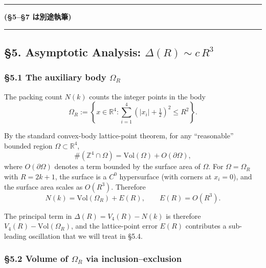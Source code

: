 \documentclass[a4paper,11pt]{article}
\theoremstyle{definition}
\begin{document}
\begin{center}\rule{0.5\linewidth}{0.5pt}\end{center}

\textbf{(§5--§7 は別途執筆)}

\begin{center}\rule{0.5\linewidth}{0.5pt}\end{center}

\subsection{\texorpdfstring{§5. Asymptotic Analysis:
\(\Delta(R) \sim c\,R^3\)}{§5. Asymptotic Analysis: \textbackslash Delta(R) \textbackslash sim c\textbackslash,R\^{}3}}\label{asymptotic-analysis-deltar-sim-cr3}

\subsubsection{\texorpdfstring{§5.1 The auxiliary body
\(\Omega_R\)}{§5.1 The auxiliary body \textbackslash Omega\_R}}\label{the-auxiliary-body-omega_r}

The packing count \(N(k)\) counts the integer points in the body
\[\Omega_R := \left\{x \in \mathbb{R}^4 : \sum_{i=1}^{4} (|x_i| + \tfrac{1}{2})^2 \le R^2\right\}.\]

By the standard convex-body lattice-point theorem, for any
``reasonable'' bounded region \(\Omega \subset \mathbb{R}^4\),
\[\#(\mathbb{Z}^4 \cap \Omega) = \mathrm{Vol}(\Omega) + O(\partial\Omega),\]
where \(O(\partial\Omega)\) denotes a term bounded by the surface area
of \(\Omega\). For \(\Omega = \Omega_R\) with \(R = 2k+1\), the surface
is a \(C^0\) hypersurface (with corners at \(x_i = 0\)), and the surface
area scales as \(O(R^3)\). Therefore
\[N(k) = \mathrm{Vol}(\Omega_R) + E(R), \qquad E(R) = O(R^3).\]

The principal term in \(\Delta(R) = V_4(R) - N(k)\) is therefore
\(V_4(R) - \mathrm{Vol}(\Omega_R)\), and the lattice-point error
\(E(R)\) contributes a sub-leading oscillation that we will treat in
§5.4.

\subsubsection{\texorpdfstring{§5.2 Volume of \(\Omega_R\) via
inclusion--exclusion}{§5.2 Volume of \textbackslash Omega\_R via inclusion--exclusion}}\label{volume-of-omega_r-via-inclusionexclusion}
\end{document}

